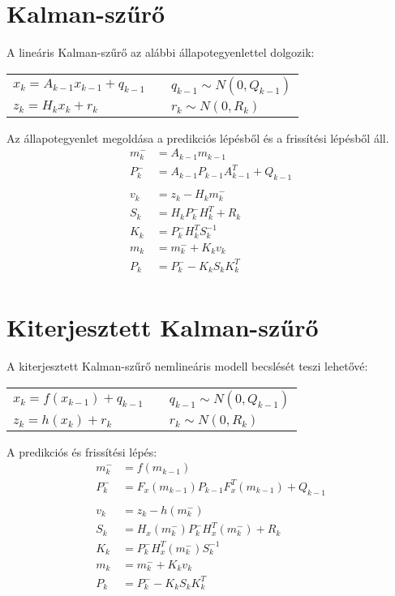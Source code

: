 \section{Kalman-szűrő}
A lineáris Kalman-szűrő az alábbi állapotegyenlettel dolgozik:
\begin{center}
	\begin{tabular}{lll}
		$x_k=A_{k-1}x_{k-1}+q_{k-1}$ && $q_{k-1} \sim N(0,Q_{k-1})$ \\
		$z_k=H_kx_k+r_k$ && $r_k \sim N(0,R_k)$ \\
	\end{tabular}		
\end{center}

Az állapotegyenlet megoldása a predikciós lépésből és a frissítési lépésből áll.
\begin{equation}
\begin{split}
m_k^- &= A_{k-1}m_{k-1} \\
P_k^- &= A_{k-1}P_{k-1}A_{k-1}^T + Q_{k-1} \\
\\
v_k &= z_k-H_k m_k^- \\
S_k &= H_k P_k^- H_k^T+R_k \\
K_k &= P_k^- H_k^T S_k^{-1} \\
m_k &= m_k^- + K_k v_k \\
P_k &= P_k^- - K_k S_k K_k^T \\
\end{split}
\end{equation}

\section{Kiterjesztett Kalman-szűrő}
A kiterjesztett Kalman-szűrő nemlineáris modell becslését teszi lehetővé:
\begin{center}
	\begin{tabular}{lll}
		$x_k=f(x_{k-1})+q_{k-1}$ && $q_{k-1} \sim N(0,Q_{k-1})$ \\
		$z_k=h(x_k)+r_k$ && $r_k \sim N(0,R_k)$ \\
	\end{tabular}		
\end{center}

A predikciós és frissítési lépés:
\begin{equation}
\begin{split}
m_k^- &= f(m_{k-1}) \\
P_k^- &= F_x(m_{k-1})P_{k-1}F_x^T(m_{k-1})+Q_{k-1} \\
\\
v_k &= z_k-h(m_k^-) \\
S_k &= H_x(m_k^-) P_k^- H_x^T(m_k^-)+R_k \\
K_k &= P_k^- H_x^T(m_k^-) S_k^{-1} \\
m_k &= m_k^- + K_k v_k \\
P_k &= P_k^- - K_k S_k K_k^T \\
\end{split}
\end{equation}